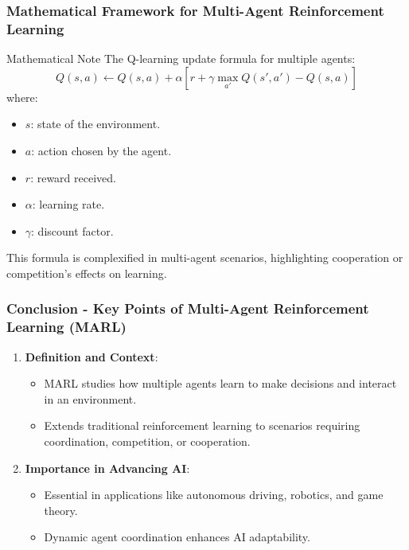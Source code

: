 \documentclass[aspectratio=169]{beamer}
\begin{document}
\begin{frame}[fragile]
    \frametitle{Mathematical Framework for Multi-Agent Reinforcement Learning}
    \begin{block}{Mathematical Note}
        The Q-learning update formula for multiple agents:
        \begin{equation}
            Q(s, a) \gets Q(s, a) + \alpha \left[ r + \gamma \max_{a'} Q(s', a') - Q(s, a) \right]
        \end{equation}
        where:
        \begin{itemize}
            \item \( s \): state of the environment.
            \item \( a \): action chosen by the agent.
            \item \( r \): reward received.
            \item \( \alpha \): learning rate.
            \item \( \gamma \): discount factor.
        \end{itemize}
        This formula is complexified in multi-agent scenarios, highlighting cooperation or competition's effects on learning.
    \end{block}
\end{frame}

\begin{frame}[fragile]
    \frametitle{Conclusion - Key Points of Multi-Agent Reinforcement Learning (MARL)}
    \begin{enumerate}
        \item \textbf{Definition and Context}:
        \begin{itemize}
            \item MARL studies how multiple agents learn to make decisions and interact in an environment.
            \item Extends traditional reinforcement learning to scenarios requiring coordination, competition, or cooperation.
        \end{itemize}

        \item \textbf{Importance in Advancing AI}:
        \begin{itemize}
            \item Essential in applications like autonomous driving, robotics, and game theory.
            \item Dynamic agent coordination enhances AI adaptability.
        \end{itemize}
    \end{enumerate}
\end{frame}
\end{document}
